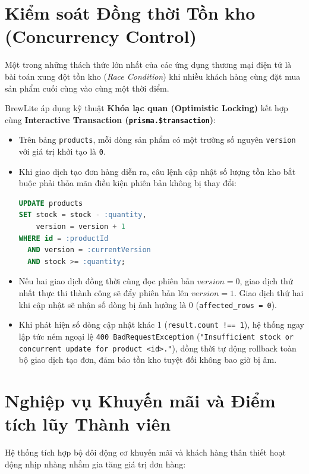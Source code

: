\section{Kiểm soát Đồng thời Tồn kho (Concurrency Control)}
Một trong những thách thức lớn nhất của các ứng dụng thương mại điện tử là bài toán xung đột tồn kho (\textit{Race Condition}) khi nhiều khách hàng cùng đặt mua sản phẩm cuối cùng vào cùng một thời điểm.

BrewLite áp dụng kỹ thuật \textbf{Khóa lạc quan (Optimistic Locking)} kết hợp cùng \textbf{Interactive Transaction (\texttt{prisma.\$transaction})}:
\begin{itemize}
    \item Trên bảng \texttt{products}, mỗi dòng sản phẩm có một trường số nguyên \texttt{version} với giá trị khởi tạo là \texttt{0}.
    \item Khi giao dịch tạo đơn hàng diễn ra, câu lệnh cập nhật số lượng tồn kho bắt buộc phải thỏa mãn điều kiện phiên bản không bị thay đổi:
    \begin{lstlisting}[language=SQL]
UPDATE products
SET stock = stock - :quantity,
    version = version + 1
WHERE id = :productId 
  AND version = :currentVersion 
  AND stock >= :quantity;
    \end{lstlisting}
    \item Nếu hai giao dịch đồng thời cùng đọc phiên bản \(version = 0\), giao dịch thứ nhất thực thi thành công sẽ đẩy phiên bản lên \(version = 1\). Giao dịch thứ hai khi cập nhật sẽ nhận số dòng bị ảnh hưởng là 0 (\texttt{affected\_rows = 0}).
    \item Khi phát hiện số dòng cập nhật khác 1 (\texttt{result.count !== 1}), hệ thống ngay lập tức ném ngoại lệ \texttt{400 BadRequestException} (\texttt{"Insufficient stock or concurrent update for product <id>."}), đồng thời tự động rollback toàn bộ giao dịch tạo đơn, đảm bảo tồn kho tuyệt đối không bao giờ bị âm.
\end{itemize}

\section{Nghiệp vụ Khuyến mãi và Điểm tích lũy Thành viên}
Hệ thống tích hợp bộ đôi động cơ khuyến mãi và khách hàng thân thiết hoạt động nhịp nhàng nhằm gia tăng giá trị đơn hàng:

